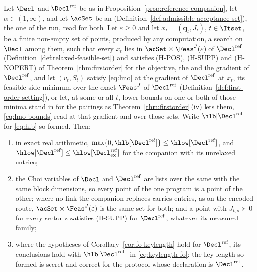\begin{corollary}\label{cor:fo-reference}
Let $\Decl$ and $\Decl^{\mathrm{ref}}$ be as in
Proposition~\ref{prop:reference-companion}, let $\alpha\in(1,\infty)$, and let
$\acSet$ be an 
(Definition~\ref{def:admissible-acceptance-set}), the one of the run, read
for both. Let $\varepsilon\ge0$ and let $x_t=(\mathbf q_t,J_t)$,
$t\in\Itset$, be a finite non-empty set of points, produced by any
computation, a search on $\Decl$ among them, such that every $x_t$ lies in
$\acSet\times\Feas^{J}(\varepsilon)$ of $\Decl^{\mathrm{ref}}$
(Definition~\ref{def:relaxed-feasible-set}) and satisfies (H-POS), (H-SUPP)
and (H-NOPERT) of Theorem~\ref{thm:firstorder} for the objective, the  and the gradient of $\Decl^{\mathrm{ref}}$, and let $(v_t,S_t)$
satisfy \eqref{eq:lmo} at the gradient of $\Decl^{\mathrm{ref}}$ at $x_t$,
its feasible-side minimum over the exact $\Feas^{J}$ of $\Decl^{\mathrm{ref}}$
(Definition~\ref{def:first-order-setting}), or let, at some or all $t$,
lower bounds on one or both of those minima stand in for the pairings as
Theorem~\ref{thm:firstorder}\,(iv) lets them, \eqref{eq:lmo-bounds} read
at that gradient and over those sets. Write
$\hlb[\Decl^{\mathrm{ref}}]$ for \eqref{eq:hlb} so formed. Then:
\begin{enumerate}[label=(\roman*),leftmargin=2.4em]
\item in exact real arithmetic,
  $\max\{0,\hlb[\Decl^{\mathrm{ref}}]\}\le\hlow[\Decl^{\mathrm{ref}}]$, and
  $\hlow[\Decl^{\mathrm{ref}}]\le\hlow[\Decl^{\mathrm{ref}}_{\mathrm{ex}}]$
  for the companion with its unrelaxed entries;
\item the Choi variables of $\Decl$ and $\Decl^{\mathrm{ref}}$ are lists over
  the same  with the same block dimensions,
  so every point of the one program is a point of the other; where no link
  the companion replaces carries entries, as on the encoded route,
  $\acSet\times\Feas^{J}(\varepsilon)$ is the same set for both; and a point with $J_{t,s}\succ0$ for every sector
  $s$ satisfies (H-SUPP) for $\Decl^{\mathrm{ref}}$, whatever its measured
  family;
\item where the hypotheses of Corollary~\ref{cor:fo-keylength} hold for
  $\Decl^{\mathrm{ref}}$, its conclusions hold with
  $\hlb[\Decl^{\mathrm{ref}}]$ in \eqref{eq:keylength-fo}: the key length so
  formed is secret and correct for the protocol whose declaration is
  $\Decl^{\mathrm{ref}}$.
\end{enumerate}
\end{corollary}

